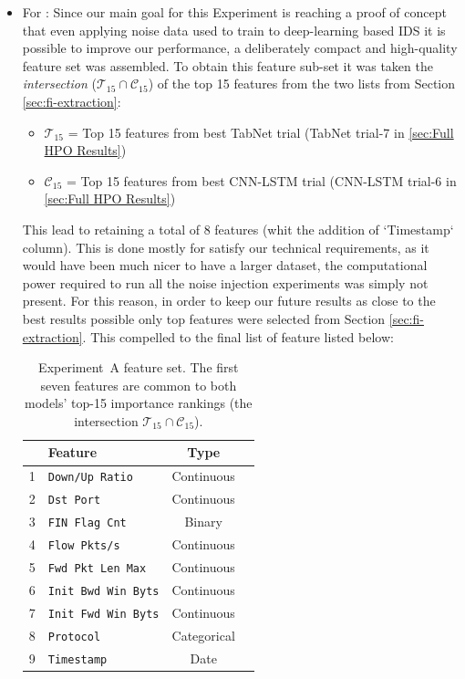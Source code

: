 \documentclass[../main.tex]{subfiles}
\begin{document}
\begin{itemize}
    \item For : Since our main goal for this Experiment is reaching a proof of concept that even applying noise data used to train to deep-learning based IDS it is possible to improve our performance, a deliberately compact and high-quality feature set was assembled. To obtain this feature sub-set it was taken the \emph{intersection} ($\mathcal{T}_{15} \cap \mathcal{C}_{15}$) of the top 15 features from the two lists from Section \ref{sec:fi-extraction}:
    \begin{itemize}
        \item $\mathcal{T}_{15}$ = Top 15 features from best TabNet trial (TabNet trial-7 in \ref{sec:Full HPO Results})
        \item $\mathcal{C}_{15}$ = Top 15 features from best CNN-LSTM trial (CNN-LSTM trial-6 in \ref{sec:Full HPO Results})
    \end{itemize}
    This lead to retaining a total of 8 features (whit the addition of `Timestamp` column). This is done mostly for satisfy our technical requirements, as it would have been much nicer to have a larger dataset, the computational power required to run all the noise injection experiments was simply not present. For this reason, in order to keep our future results as close to the best results possible only top features were selected from Section \ref{sec:fi-extraction}. This compelled to the final list of feature listed below: 
    \begin{table}[H]
        \centering
        \caption{Experiment~A feature set. The first seven features are common to both models' top-15 importance rankings (the intersection $\mathcal{T}_{15} \cap \mathcal{C}_{15}$).}
        \label{tab:selected-features-ranking}
        \small
        \begin{tabular}{llcc}
        \toprule
         &\textbf{Feature}     & \textbf{Type}  \\
        \midrule
        1 & \texttt{Down/Up Ratio}      & Continuous   \\
        2 & \texttt{Dst Port}           & Continuous   \\
        3 & \texttt{FIN Flag Cnt}       & Binary       \\
        4 & \texttt{Flow Pkts/s}        & Continuous   \\
        5 & \texttt{Fwd Pkt Len Max}    & Continuous   \\
        6 & \texttt{Init Bwd Win Byts}  & Continuous   \\
        7 & \texttt{Init Fwd Win Byts}  & Continuous   \\
        8 & \texttt{Protocol}           & Categorical  \\
        9 & \texttt{Timestamp}          & Date         \\
        \bottomrule
        \end{tabular}
    \end{table}


\end{itemize}
\end{document}
